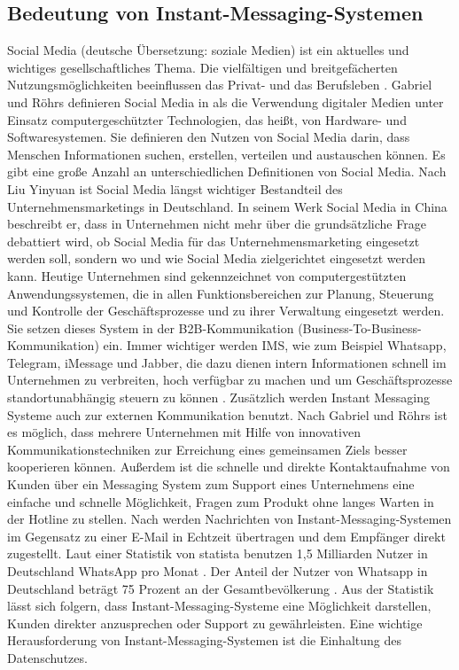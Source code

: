 \documentclass[a4paper,titlepage,halfparskip,12pt]{scrreprt}
\begin{document}
\begin{onehalfspacing}

\pagestyle{fancyheadlines}

\chapter{Bedeutung von Instant-Messaging-Systemen}
\label{chap:Einleitung}

Social Media (deutsche Übersetzung: \glqq soziale Medien\grqq{}) ist ein aktuelles und wichtiges gesellschaftliches Thema. Die vielfältigen und breitgefächerten Nutzungsmöglichkeiten beeinflussen das Privat- und das Berufsleben \cite{gabriel2017social}. Gabriel und Röhrs definieren Social Media in \cite{gabriel2017social} als die Verwendung digitaler Medien unter Einsatz computergeschützter Technologien, das heißt, von Hardware- und Softwaresystemen. Sie definieren den Nutzen von Social Media darin, dass Menschen Informationen suchen, erstellen, verteilen und austauschen können. Es gibt eine große Anzahl an unterschiedlichen Definitionen von Social Media. Nach Liu Yinyuan ist Social Media längst wichtiger Bestandteil des Unternehmensmarketings in Deutschland. In seinem Werk \glqq Social Media in China\grqq{} \cite{liu2016social} beschreibt er, dass in Unternehmen nicht mehr über die grundsätzliche Frage debattiert wird, ob Social Media für das Unternehmensmarketing eingesetzt werden soll, sondern wo und wie Social Media zielgerichtet eingesetzt werden kann. Heutige Unternehmen sind gekennzeichnet von computergestützten Anwendungssystemen, die in allen Funktionsbereichen zur Planung, Steuerung und Kontrolle der Geschäftsprozesse und zu ihrer Verwaltung eingesetzt werden. Sie setzen dieses System in der B2B-Kommunikation (Business-To-Business-Kommunikation) ein. Immer wichtiger werden \ac{IMS}, wie zum Beispiel Whatsapp, Telegram, iMessage und Jabber, die dazu dienen intern Informationen schnell im Unternehmen zu verbreiten, hoch verfügbar zu machen und um Geschäftsprozesse standortunabhängig steuern zu können \cite{gabriel2017social}. Zusätzlich werden Instant Messaging Systeme auch zur externen Kommunikation benutzt. Nach Gabriel und Röhrs ist es möglich, dass mehrere Unternehmen mit Hilfe von innovativen Kommunikationstechniken zur Erreichung eines gemeinsamen Ziels besser kooperieren können. Außerdem ist die schnelle und direkte Kontaktaufnahme von Kunden über ein Messaging System zum Support eines Unternehmens eine einfache und schnelle Möglichkeit, Fragen zum Produkt ohne langes Warten in der Hotline zu stellen. Nach \cite{b2bmehner} werden Nachrichten von Instant-Messaging-Systemen im Gegensatz zu einer E-Mail in Echtzeit übertragen und dem Empfänger direkt zugestellt. Laut einer Statistik von statista benutzen 1,5 Milliarden Nutzer in Deutschland WhatsApp pro Monat \cite{statistaIMS}. Der Anteil der Nutzer von Whatsapp in Deutschland beträgt 75 Prozent an der Gesamtbevölkerung \cite{statistaIMS}. Aus der Statistik  lässt sich folgern, dass Instant-Messaging-Systeme eine Möglichkeit darstellen, Kunden direkter anzusprechen oder Support zu gewährleisten. Eine wichtige Herausforderung von Instant-Messaging-Systemen ist die Einhaltung des Datenschutzes.


\end{onehalfspacing}
\end{document}
